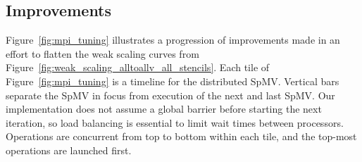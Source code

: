 \documentclass{report}
\begin{document}
\subsection{Improvements}
\label{sec:mpi_improvements}

Figure~\ref{fig:mpi_tuning} illustrates a progression of improvements made in an effort to flatten the weak scaling curves from Figure~\ref{fig:weak_scaling_alltoallv_all_stencils}. Each tile of Figure~\ref{fig:mpi_tuning} is a timeline for the distributed SpMV. Vertical bars separate the SpMV in focus from execution of the next and last SpMV. Our implementation does not assume a global barrier before starting the next iteration, so load balancing is essential to limit wait times between processors. Operations are concurrent from top to bottom within each tile, and the top-most operations are launched first.

\end{document}
